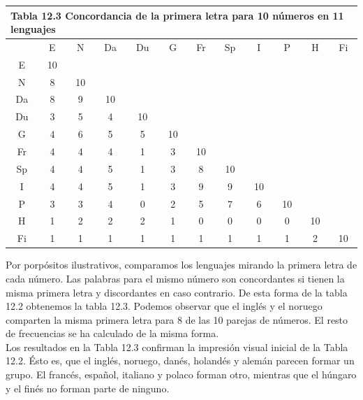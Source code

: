 \documentclass[a4paper, 20pt]{article}
\begin{document}
\begin{table}[]
\begin{tabular}{|cccccccccccc|}
\hline
\multicolumn{12}{|l|}{Tabla 12.3 Concordancia de la primera letra para 10 números en 11 lenguajes} \\ \hline
       & E      & N      & Da     & Du     & G     & Fr    & Sp    & I     & P     & H     & Fi    \\ \hline
E      & 10     &        &        &        &       &       &       &       &       &       &       \\
N      & 8      & 10     &        &        &       &       &       &       &       &       &       \\
Da     & 8      & 9      & 10     &        &       &       &       &       &       &       &       \\
Du     & 3      & 5      & 4      & 10     &       &       &       &       &       &       &       \\
G      & 4      & 6      & 5      & 5      & 10    &       &       &       &       &       &       \\
Fr     & 4      & 4      & 4      & 1      & 3     & 10    &       &       &       &       &       \\
Sp     & 4      & 4      & 5      & 1      & 3     & 8     & 10    &       &       &       &       \\
I      & 4      & 4      & 5      & 1      & 3     & 9     & 9     & 10    &       &       &       \\
P      & 3      & 3      & 4      & 0      & 2     & 5     & 7     & 6     & 10    &       &       \\
H      & 1      & 2      & 2      & 2      & 1     & 0     & 0     & 0     & 0     & 10    &       \\
Fi     & 1      & 1      & 1      & 1      & 1     & 1     & 1     & 1     & 1     & 2     & 10    \\ \hline
\end{tabular}
\end{table}

Por porpósitos ilustrativos, comparamos los lenguajes mirando la primera letra de cada número. Las palabras para el mismo número son concordantes si tienen la misma primera letra y discordantes en caso contrario. De esta forma de la tabla 12.2 obtenemos la tabla 12.3. Podemos observar que el inglés y el noruego comparten la misma primera letra para 8 de las 10 parejas de números. El resto de frecuencias se ha calculado de la misma forma.\\
Los resultados en la Tabla 12.3 confirman la impresión visual inicial de la Tabla 12.2. Ésto es, que el inglés, noruego, danés, holandés y alemán parecen formar un grupo. El francés, español, italiano y polaco forman otro, mientras que el húngaro y el finés no forman parte de ninguno.\\
\end{document}
